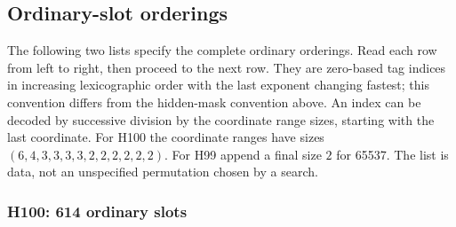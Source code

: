 \documentclass[11pt]{article}
\numberwithin{equation}{section}
\theoremstyle{definition}
\theoremstyle{remark}
\begin{document}
\subsection{Ordinary-slot orderings}
The following two lists specify the complete ordinary orderings.
Read each row from left to right, then proceed to the next row.
They are zero-based tag indices in increasing lexicographic order with
the last exponent changing fastest; this convention differs from the
hidden-mask convention above. An index can be decoded by successive division
by the coordinate range sizes, starting with the last coordinate.
For H100 the coordinate ranges have sizes
$(6,4,3,3,3,3,2,2,2,2,2,2)$. For H99 append a final size $2$ for 65537.
The list is data, not an unspecified permutation chosen by a search.

\subsubsection*{H100: 614 ordinary slots}
\end{document}
